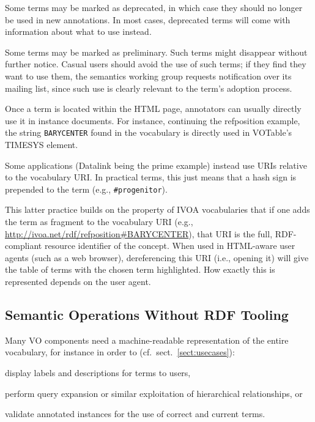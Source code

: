 \documentclass[11pt,a4paper]{ivoa}
\begin{document}
Some terms may be marked as deprecated, in which case they should no
longer be used in new annotations.  In most cases, deprecated terms will
come with information about what to use instead.

Some terms may be marked as preliminary.  Such terms might disappear
without further notice.  Casual users should avoid the use of such
terms; if they find they want to use them, the semantics working group
requests notification over its mailing list, since such use is clearly
relevant to the term's adoption process.

Once a term is located within the HTML page, annotators can usually
directly use it in instance documents.  For instance, continuing the
refposition example, the string \texttt{BARYCENTER} found in the
vocabulary is directly used in VOTable's TIMESYS element.  

Some applications (Datalink being the prime example) instead use URIs
relative to the vocabulary URI.  In practical terms, this just means
that a hash sign is prepended to the term (e.g., \texttt{\#progenitor}).

This latter practice builds on the property of IVOA vocabularies that if
one adds the term as fragment to the vocabulary URI (e.g.,
\url{http://ivoa.net/rdf/refposition#BARYCENTER}), that URI is the full,
RDF-compliant resource identifier of the concept.  When used in
HTML-aware user agents (such as a web browser), dereferencing this URI
(i.e., opening it) will give the table of terms with the chosen term
highlighted.  How exactly this is represented depends on the user agent.


\subsection{Semantic Operations Without RDF Tooling}
\label{sect:desise}

Many VO components need a machine-readable representation of the
entire vocabulary, for instance in order to
(cf.~sect.~\ref{sect:usecases}):

\begin{compactitem}
\item display labels and descriptions for terms to users,
\item perform query expansion or similar exploitation of hierarchical
relationships, or
\item validate annotated instances for the use of correct and current
terms.
\end{compactitem}
\end{document}
